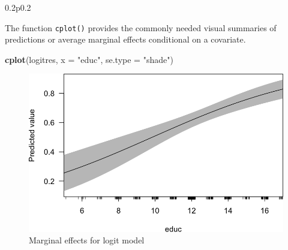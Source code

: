 \documentclass[]{book}
\newenvironment{Shaded}{\begin{snugshade}}{\end{snugshade}}
\newcommand{\DataTypeTok}[1]{\textcolor[rgb]{0.13,0.29,0.53}{#1}}
\newcommand{\KeywordTok}[1]{\textcolor[rgb]{0.13,0.29,0.53}{\textbf{#1}}}
\newcommand{\NormalTok}[1]{#1}
\newcommand{\StringTok}[1]{\textcolor[rgb]{0.31,0.60,0.02}{#1}}
\begin{document}
\begin{table}[h]
\begin{raggedright}
\begin{threeparttable}
\begin{tabularx}{0.2\textwidth}{p{}}
 \tabularnewline[-0.5pt]



 \tabularnewline[-0.5pt]



 \tabularnewline[-0.5pt]


\end{tabularx}\end{threeparttable}
\par\end{raggedright}

\end{table}
 

The function \texttt{cplot()} provides the commonly needed visual summaries of predictions or average marginal effects conditional on a covariate.

\begin{Shaded}
\begin{Highlighting}[]
\KeywordTok{cplot}\NormalTok{(logitres, }\DataTypeTok{x =} \StringTok{"educ"}\NormalTok{, }\DataTypeTok{se.type =} \StringTok{"shade"}\NormalTok{)}
\end{Highlighting}
\end{Shaded}

\begin{figure}

{\centering \includegraphics[width=0.8\linewidth]{MEM5220_R_files/figure-latex/fig24-1} 

}

\caption{Marginal effects for logit model}\label{fig:fig24}
\end{figure}
\end{document}
